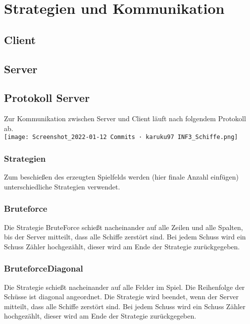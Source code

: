 \section*{Strategien und Kommunikation}

\subsection*{Client}




\subsection*{Server}

\subsection*{Protokoll Server}
Zur Kommunikation zwischen Server und Client läuft nach folgendem Protokoll ab.\\
\texttt{[image: Screenshot\_2022-01-12 Commits · karuku97 INF3\_Schiffe.png]}
\\
\subsubsection*{Strategien}
Zum beschießen des erzeugten Spielfelds werden (hier finale Anzahl einfügen) unterschiedliche Strategien verwendet.

\subsubsection*{Bruteforce}

Die Strategie BruteForce schießt nacheinander auf alle Zeilen und alle Spalten, bis der Server mitteilt, dass alle Schiffe zerstört sind. Bei jedem Schuss wird ein Schuss Zähler hochgezählt, dieser wird am Ende der Strategie zurückgegeben.

\subsubsection*{BruteforceDiagonal}

Die Strategie schießt nacheinander auf alle Felder im Spiel. Die Reihenfolge der Schüsse ist diagonal angeordnet. Die Strategie wird beendet, wenn der Server mitteilt, dass alle Schiffe zerstört sind. Bei jedem Schuss wird ein Schuss Zähler hochgezählt, dieser wird am Ende der Strategie zurückgegeben.

